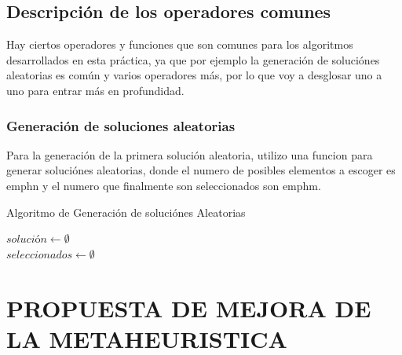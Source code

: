 \documentclass{article}
\begin{document}
\subsection{\normalsize Descripción de los operadores comunes}
Hay ciertos operadores y funciones que son comunes para los algoritmos desarrollados en esta práctica,
ya que por ejemplo la generación de soluciónes aleatorias es común y varios operadores
más, por lo que voy a desglosar uno a uno para entrar más en profundidad.

\vspace{3mm}

\subsubsection{\small Generación de soluciones aleatorias}
Para la generación de la primera solución aleatoria, utilizo una funcion para generar soluciónes
aleatorias, donde el numero de posibles elementos a escoger es emph{n} y el numero que finalmente son seleccionados
son emph{m}.

\begin{algorithm}
	\label{Algoritmo de Generacion de soluciones Aleatorias}
	\caption{Algoritmo de Generación de soluciónes Aleatorias}
	\vspace{3mm}

	$solución \leftarrow \emptyset $\\
	$seleccionados \leftarrow \emptyset $\\
	\vspace{3mm}

\end{algorithm}

\vspace{3mm}




\newpage
\section{\large PROPUESTA DE MEJORA DE LA METAHEURISTICA}
\end{document}
